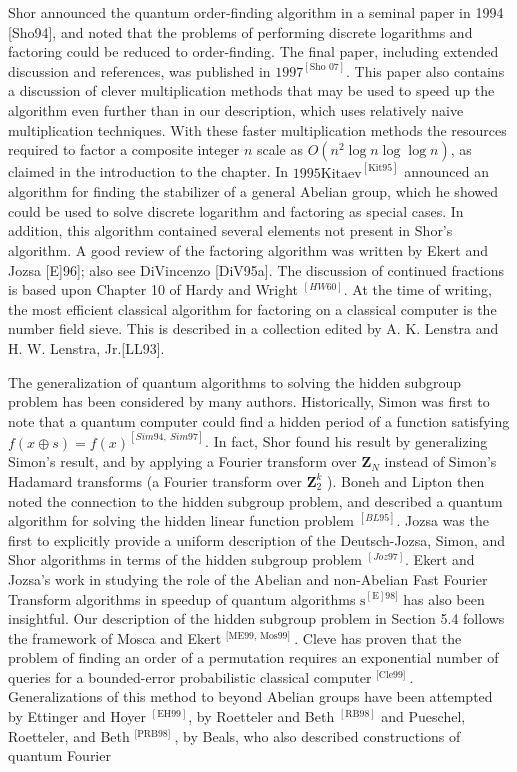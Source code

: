 Shor announced the quantum order-finding algorithm in a seminal paper in 1994 [Sho94], and noted that the problems of performing discrete logarithms and factoring could be reduced to order-finding. The final paper, including extended discussion and references, was published in $1997^{[\text {Sho } 07]}$. This paper also contains a discussion of clever multiplication methods that may be used to speed up the algorithm even further than in our description, which uses relatively naive multiplication techniques. With these faster multiplication methods the resources required to factor a composite integer $n$ scale as $O\left(n^{2} \log n \log \log n\right)$, as claimed in the introduction to the chapter. In $1995 \mathrm{Kitaev}^{[\mathrm{Kit} 95]}$ announced an algorithm for finding the stabilizer of a general Abelian group, which he showed could be used to solve discrete logarithm and factoring as special cases. In addition, this algorithm contained several elements not present in Shor's algorithm. A good review of the factoring algorithm was written by Ekert and Jozsa [E]96]; also see DiVincenzo [DiV95a]. The discussion of continued fractions is based upon Chapter 10 of Hardy and Wright ${ }^{[H W 60]}$. At the time of writing, the most efficient classical algorithm for factoring on a classical computer is the number field sieve. This is described in a collection edited by A. K. Lenstra and H. W. Lenstra, Jr.[LL93].

The generalization of quantum algorithms to solving the hidden subgroup problem has been considered by many authors. Historically, Simon was first to note that a quantum computer could find a hidden period of a function satisfying $f(x \oplus s)=f(x)^{[S i m 94, ~ S i m 97]}$. In fact, Shor found his result by generalizing Simon's result, and by applying a Fourier transform over $\mathbf{Z}_{N}$ instead of Simon's Hadamard transforms (a Fourier transform over $\mathbf{Z}_{2}^{k}$ ). Boneh and Lipton then noted the connection to the hidden subgroup problem, and described a quantum algorithm for solving the hidden linear function problem ${ }^{[B L 95]}$. Jozsa was the first to explicitly provide a uniform description of the Deutsch-Jozsa, Simon, and Shor algorithms in terms of the hidden subgroup problem ${ }^{[J o z 97]}$. Ekert and Jozsa's work in studying the role of the Abelian and non-Abelian Fast Fourier Transform algorithms in speedup of quantum algorithms $\mathrm{s}^{[\mathrm{E}] 98]}$ has also been insightful. Our description of the hidden subgroup problem in Section 5.4 follows the framework of Mosca and Ekert ${ }^{[\text {ME99, Mos99] }}$. Cleve has proven that the problem of finding an order of a permutation requires an exponential number of queries for a bounded-error probabilistic classical computer ${ }^{[\text {Cle99] }}$. Generalizations of this method to beyond Abelian groups have been attempted by Ettinger and Hoyer ${ }^{[\mathrm{EH} 99]}$, by Roetteler and Beth ${ }^{[\mathrm{RB} 98]}$ and Pueschel, Roetteler, and Beth ${ }^{[\text {PRB98] }}$, by Beals, who also described constructions of quantum Fourier

